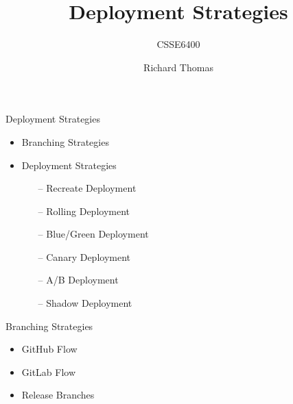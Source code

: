 \documentclass{slide}
\title{Deployment Strategies}
\subtitle{CSSE6400}
\author{Richard Thomas}
\date{\week{12}}
\begin{document}
\maketitle


\begin{frame}{Deployment Strategies}
  \vspace{1pt}
  {\huge
    \begin{itemize}
        \item Branching Strategies
        \vspace{6pt}
        \item Deployment Strategies
	    \begin{itemize}
	        \LARGE\item[--] Recreate Deployment
	        \LARGE\item[--] Rolling Deployment
	        \LARGE\item[--] Blue/Green Deployment
	        \LARGE\item[--] Canary Deployment
	        \LARGE\item[--] A/B Deployment
	        \LARGE\item[--] Shadow Deployment
	    \end{itemize}
    \end{itemize}
  }
\end{frame}


\begin{frame}{Branching Strategies}
  \vspace{1pt}
  {\huge{
    \begin{itemize}
        \item GitHub Flow
        \item GitLab Flow
        \item Release Branches
    \end{itemize}
  }}
\end{frame}
\end{document}
